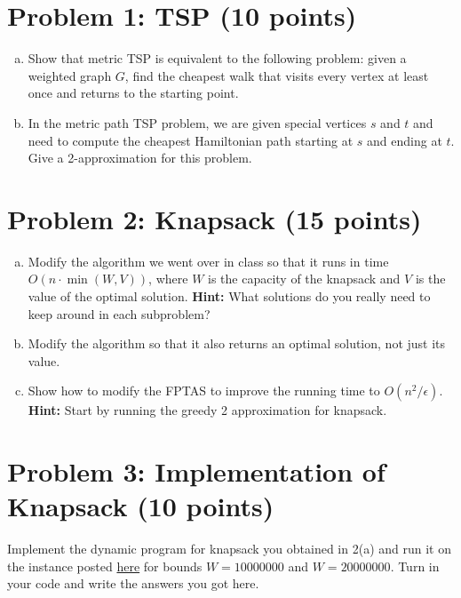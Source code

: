 



\noindent
   \begin{center}
   \end{center}


\section{Problem 1: TSP (10 points)} 

\begin{enumerate}[(a)]
\item Show that metric TSP is equivalent to the following problem: given a weighted graph $G$, find the cheapest walk that visits every vertex at least once and returns to the starting point.
\item In the metric path TSP problem, we are given special vertices $s$ and $t$ and need to compute the cheapest Hamiltonian path starting at $s$ and ending at $t$. Give a 2-approximation for this problem.
\end{enumerate}

\section{Problem 2: Knapsack (15 points)}

\begin{enumerate}[(a)]
\item Modify the algorithm we went over in class so that it runs in time $O(n \cdot \min(W,V))$, where $W$ is the capacity of the knapsack and $V$ is the value of the optimal solution. \textbf{Hint:} What solutions do you really need to keep around in each subproblem?
\item Modify the algorithm so that it also returns an optimal solution, not just its value.
\item Show how to modify the FPTAS to improve the running time to $O(n^2/\epsilon)$. \textbf{Hint:} Start by running the greedy 2 approximation for knapsack.
\end{enumerate}

\section{Problem 3: Implementation of Knapsack (10 points)}

Implement the dynamic program for knapsack you obtained in 2(a) and run it on the instance posted \href{https://nathan-klein.github.io/algs-materials/knapsack.py}{here} for bounds $W=10000000$ and $W=20000000$. Turn in your code and write the answers you got here.

